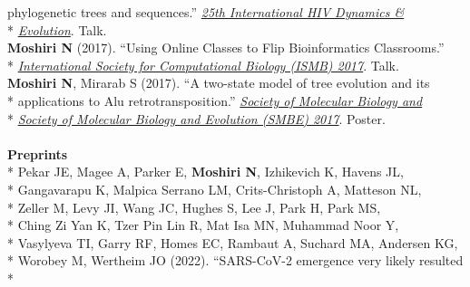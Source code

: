\documentclass[margin,line]{res}
\begin{document}
\begin{resume}
\hspace*{9mm} phylogenetic trees and sequences.'' \href{https://cme.ucsd.edu/hivdynamics/}{\textit{25th International HIV Dynamics \&}}\\*\vspace{2mm}
\hspace*{8mm} \href{https://cme.ucsd.edu/hivdynamics/}{\textit{Evolution}}. Talk.\\
\hspace*{4mm} \textbf{Moshiri N} (2017). ``Using Online Classes to Flip Bioinformatics Classrooms.''\\*\vspace{2mm}
\hspace*{8mm} \href{https://www.iscb.org/cms_addon/conferences/ismbeccb2017/technologytrack.php}{\textit{International Society for Computational Biology (ISMB) 2017}}. Talk.\\
\hspace*{4mm} \textbf{Moshiri N}, Mirarab S (2017). ``A two-state model of tree evolution and its\\*
\hspace*{9mm} applications to Alu retrotransposition.'' \href{https://smbe.org/smbe/}{\textit{Society of Molecular Biology and}}\\*\vspace{2mm}
\hspace*{8mm} \href{https://smbe.org/smbe/}{\textit{Society of Molecular Biology and Evolution (SMBE) 2017}}. Poster.\\
~\\
\newpage
\textbf{Preprints}\vspace{2mm}\\*
\hspace*{4mm} Pekar JE, Magee A, Parker E, \textbf{Moshiri N}, Izhikevich K, Havens JL,\\*
\hspace*{9mm} Gangavarapu K, Malpica Serrano LM, Crits-Christoph A, Matteson NL,\\*
\hspace*{9mm} Zeller M, Levy JI, Wang JC, Hughes S, Lee J, Park H, Park MS,\\*
\hspace*{9mm} Ching Zi Yan K, Tzer Pin Lin R, Mat Isa MN, Muhammad Noor Y,\\*
\hspace*{9mm} Vasylyeva TI, Garry RF, Homes EC, Rambaut A, Suchard MA, Andersen KG,\\*
\hspace*{9mm} Worobey M, Wertheim JO (2022). ``SARS-CoV-2 emergence very likely resulted\\*\vspace{2mm}

\end{resume}
\end{document}
